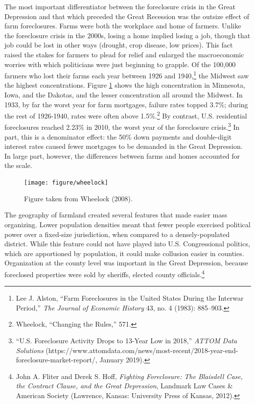 \documentclass[12pt,oneside]{psthesis}
\begin{document}
The most important differentiator between the foreclosure crisis in the Great Depression and that which preceded the Great Recession was the outsize effect of farm foreclosures.
Farms were both the workplace and home of farmers.
Unlike the foreclosure crisis in the 2000s, losing a home implied losing a job, though that job could be lost in other ways (drought, crop disease, low prices).
This fact raised the stakes for farmers to plead for relief and enlarged the macroeconomic worries with which politicians were just beginning to grapple.
Of the 100,000 farmers who lost their farms each year between 1926 and 1940,\footnote{Lee J. Alston, ``Farm Foreclosures in the United States During the Interwar Period,'' \emph{The Journal of Economic History} 43, no. 4 (1983): 885--903.} the Midwest saw the highest concentrations.
Figure \ref{fig:wheelock-farms} shows the high concentration in Minnesota, Iowa, and the Dakotas, and the lesser concentration all around the Midwest.
In 1933, by far the worst year for farm mortgages, failure rates topped 3.7\%; during the rest of 1926-1940, rates were often above 1.5\%.\footnote{Wheelock, ``Changing the Rules,'' 571.}
By contrast, U.S. residential foreclosures reached 2.23\% in 2010, the worst year of the foreclosure crisis.\footnote{``U.S. Foreclosure Activity Drops to 13-Year Low in 2018,'' \emph{ATTOM Data Solutions} (https://www.attomdata.com/news/most-recent/2018-year-end-foreclosure-market-report/, January 2019).}
In part, this is a denominator effect: the 50\% down payments and double-digit interest rates caused fewer mortgages to be demanded in the Great Depression.
In large part, however, the differences between farms and homes accounted for the scale.
\begin{figure}

{\centering \texttt{[image: figure/wheelock]} 

}

\caption{Figure taken from Wheelock (2008).}\label{fig:wheelock-farms}
\end{figure}
The geography of farmland created several features that made easier mass organizing.
Lower population densities meant that fewer people exercised political power over a fixed-size jurisdiction, when compared to a densely-populated district.
While this feature could not have played into U.S. Congressional politics, which are apportioned by population, it could make collusion easier in counties.
Organization at the county level was important in the Great Depression, because foreclosed properties were sold by sheriffs, elected county officials.\footnote{John A. Fliter and Derek S. Hoff, \emph{Fighting Foreclosure: The Blaisdell Case, the Contract Clause, and the Great Depression}, Landmark Law Cases \& American Society (Lawrence, Kansas: University Press of Kansas, 2012).}
\end{document}
